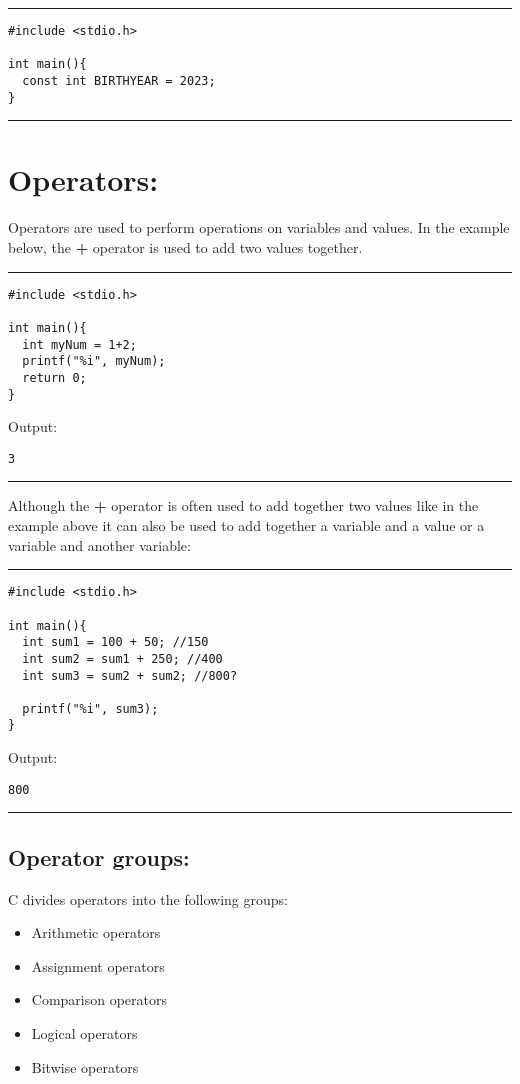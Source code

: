 \documentclass[a4paper]{article}
\begin{document}
\noindent\rule{\textwidth}{0.5pt}
\begin{verbatim}
#include <stdio.h>

int main(){
  const int BIRTHYEAR = 2023;
}
\end{verbatim}

\noindent\rule{\textwidth}{0.5pt}
\clearpage
\section{Operators:}
\label{sec:orgf50664a}
Operators are used to perform operations on variables and values.
In the example below, the \textbf{+} operator is used to add two values together.

\noindent\rule{\textwidth}{0.5pt}
\begin{verbatim}
#include <stdio.h>

int main(){
  int myNum = 1+2;
  printf("%i", myNum);
  return 0;
}
\end{verbatim}
Output:
\begin{verbatim}
3
\end{verbatim}

\noindent\rule{\textwidth}{0.5pt}
Although the \textbf{+} operator is often used to add together two values like in the
example above it can also be used to add together a variable and a value or a
variable and another variable:

\noindent\rule{\textwidth}{0.5pt}
\begin{verbatim}
#include <stdio.h>

int main(){
  int sum1 = 100 + 50; //150 
  int sum2 = sum1 + 250; //400
  int sum3 = sum2 + sum2; //800?

  printf("%i", sum3);
}
\end{verbatim}
Output:
\begin{verbatim}
800
\end{verbatim}

\noindent\rule{\textwidth}{0.5pt}
\subsection{Operator groups:}
\label{sec:org26ae17b}
C divides operators into the following groups:
\begin{itemize}
\item Arithmetic operators
\item Assignment operators
\item Comparison operators
\item Logical operators
\item Bitwise operators
\end{itemize}
\end{document}
